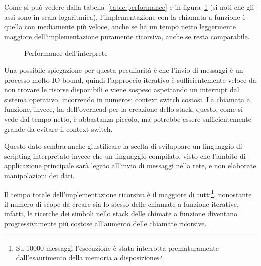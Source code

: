 \documentclass[10pt]{article}
\begin{document}
Come si può vedere dalla tabella~\ref{table:performance} e in figura~\ref{fig:performance-graph} (si noti che gli assi sono in scala logaritmica), l'implementazione con la chiamata a funzione è quella con mediamente più veloce, anche se ha un tempo netto leggermente maggiore dell'implementazione puramente ricorsiva, anche se resta comparabile.

\begin{figure}
	\centering
	\caption{Performance dell'interprete}
	\label{fig:performance-graph}
\end{figure}

Una possibile spiegazione per questa peculiarità è che l'invio di messaggi è un processo molto IO-bound, quindi l'approccio iterativo è sufficientemente veloce da non trovare le risorse disponibili e viene sospeso aspettando un interrupt dal sistema operativo, incorrendo in numerosi context switch costosi. La chiamata a funzione, invece, ha dell'overhead per la creazione dello stack, questo, come si vede dal tempo netto, è abbastanza piccolo, ma potrebbe essere sufficientemente grande da evitare il context switch.

Questo dato sembra anche giustificare la scelta di sviluppare un linguaggio di scripting interpretato invece che un linguaggio compilato, visto che l'ambito di applicazione principale sarà legato all'invio di messaggi nella rete, e non elaborate manipolazioni dei dati.

Il tempo totale dell'implementazione ricorsiva è il maggiore di tutti\footnote{Su 10000 messaggi l'esecuzione è stata interrotta prematuramente dall'esaurimento della memoria a disposizione}, nonostante il numero di scope da creare sia lo stesso delle chiamate a funzione iterative, infatti, le ricerche dei simboli nello stack delle chimate a funzione diventano progressivamente più costose all'aumento delle chiamate ricorsive.
\end{document}

